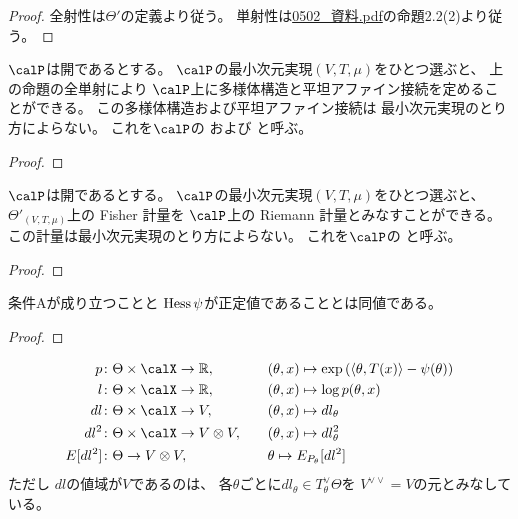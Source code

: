 \documentclass[report]{jlreq}
\begin{document}
\begin{proof}
    全射性は$\Theta'$の定義より従う。
    単射性は\url{0502_資料.pdf}の命題2.2(2)より従う。
\end{proof}

\begin{propdef}
    $\calP$は開であるとする。
    $\calP$の最小次元実現$(V, T, \mu)$をひとつ選ぶと、
    上の命題の全単射により
    $\calP$上に多様体構造と平坦アファイン接続を定めることができる。
    この多様体構造および平坦アファイン接続は
    最小次元実現のとり方によらない。
    これを$\calP$の
    および
    と呼ぶ。
\end{propdef}

\begin{proof}
\end{proof}

\begin{propdef}
    $\calP$は開であるとする。
    $\calP$の最小次元実現$(V, T, \mu)$をひとつ選ぶと、
    $\Theta'_{(V, T, \mu)}$上の Fisher 計量を
    $\calP$上の Riemann 計量とみなすことができる。
    この計量は最小次元実現のとり方によらない。
    これを$\calP$の
    と呼ぶ。
\end{propdef}

\begin{proof}
    \TODO{}
\end{proof}

\begin{proposition}
    条件Aが成り立つことと
    $\operatorname{Hess}\psi$が正定値であることとは同値である。
\end{proposition}

\begin{proof}
    \TODO{}
\end{proof}

\begin{definition}[スコア関数]
    \begin{alignat}{2}
        p
            &\colon \Theta \times \calX \to \R, \quad
            &&(\theta, x) \mapsto \exp\myparen{
                \langle \theta, T(x) \rangle - \psi(\theta)
            }
            \\
        l
            &\colon \Theta \times \calX \to \R, \quad
            &&(\theta, x) \mapsto \log p(\theta, x)
            \\
        dl
            &\colon \Theta \times \calX \to V, \quad
            &&(\theta, x) \mapsto dl_\theta
            \\
        dl^2
            &\colon \Theta \times \calX \to V \otimes V, \quad
            &&(\theta, x) \mapsto dl_\theta^2
            \\
        E[dl^2]
            &\colon \Theta \to V \otimes V, \quad
            &&\theta \mapsto E_{P_\theta}[dl^2]
    \end{alignat}
    ただし
    $dl$の値域が$V$であるのは、
    各$\theta$ごとに$dl_\theta \in T^\vee_\theta \Theta$を
    $V^{\vee\vee} = V$の元とみなしている。
\end{definition}
\end{document}
